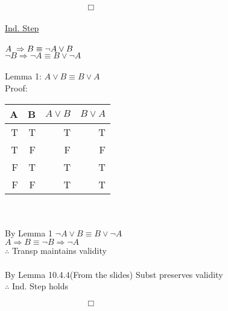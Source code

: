 \documentclass{article}
\begin{document}
	$\hspace{4cm} \Box$\\\\
	\underline{Ind. Step}\\\\
	$A\hspace{0.1cm}\Rightarrow B \equiv \neg A \vee B$
	\\$\neg B \Rightarrow \neg A \equiv B \vee \neg A$
	\\\\Lemma 1: $A \vee B \equiv B \vee A$
	\\Proof: \\
	\begin{tabular}{|r|r|r|r|}
		\hline
		A & B & $A \vee B$ & $B \vee A$ \\
		\hline
		T & T & T & T \\
		T & F & F & F \\
		F & T & T & T \\
		F & F & T & T \\
		\hline
	\end{tabular}
	\\\\By Lemma 1 $\neg A \vee B \equiv B \vee \neg A$
	\\$A \Rightarrow B \equiv \neg B \Rightarrow \neg A$
	\\$\therefore$ Transp maintains validity\\
	\\By Lemma 10.4.4(From the slides) Subst preserves validity\\
	$\therefore$ Ind. Step holds
	
	$\hspace{4cm} \Box$
\end{document}
